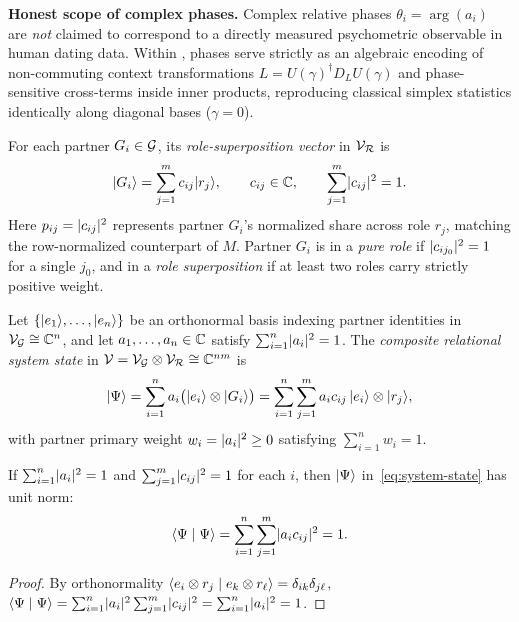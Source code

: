 \noindent\layerbehav{} \textbf{Honest scope of complex phases.} Complex relative phases
$\theta_i = \arg(a_i)$ are \emph{not} claimed to correspond to a directly measured
psychometric observable in human dating data. Within \RST{}, phases serve strictly as an
algebraic encoding of non-commuting context transformations $L = U(\gamma)^\dagger D_L U(\gamma)$
and phase-sensitive cross-terms inside inner products, reproducing classical simplex
statistics identically along diagonal bases ($\gamma = 0$).

\begin{definition}
\label{def:partner-state}
For each partner $G_i \in \mathcal{G}$, its \emph{role-superposition vector} in $\mathcal{V}_{\mathcal{R}}$ is
\begin{equation}
  \lvert G_i \rangle = \sum_{j=1}^{m} c_{ij} \lvert r_j \rangle,
  \qquad c_{ij} \in \mathbb{C},
  \qquad \sum_{j=1}^{m} \lvert c_{ij} \rvert^2 = 1.
  \label{eq:partner-state}
\end{equation}
Here $p_{ij} = \lvert c_{ij} \rvert^2$ represents partner $G_i$'s normalized share across role $r_j$,
matching the row-normalized counterpart of $M$. Partner $G_i$ is in a \emph{pure role} if
$\lvert c_{ij_0} \rvert^2 = 1$ for a single $j_0$, and in a \emph{role superposition} if at least
two roles carry strictly positive weight.
\end{definition}

\begin{definition}
\label{def:system-state}
Let $\{\lvert e_1 \rangle, \dots, \lvert e_n \rangle\}$ be an orthonormal basis indexing partner identities
in $\mathcal{V}_{\mathcal{G}} \cong \mathbb{C}^n$, and let $a_1, \dots, a_n \in \mathbb{C}$ satisfy
$\sum_{i=1}^n \lvert a_i \rvert^2 = 1$. The \emph{composite relational system state} in
$\mathcal{V} = \mathcal{V}_{\mathcal{G}} \otimes \mathcal{V}_{\mathcal{R}} \cong \mathbb{C}^{nm}$ is
\begin{equation}
  \lvert \Psi \rangle = \sum_{i=1}^{n} a_i \bigl(\lvert e_i \rangle \otimes \lvert G_i \rangle\bigr)
  = \sum_{i=1}^{n} \sum_{j=1}^{m} a_i c_{ij}\, \lvert e_i \rangle \otimes \lvert r_j \rangle,
  \label{eq:system-state}
\end{equation}
with partner primary weight $w_i = \lvert a_i \rvert^2 \ge 0$ satisfying $\sum_{i=1}^n w_i = 1$.
\end{definition}

\begin{lemma}
\label{lem:composite-norm}
If $\sum_{i=1}^n \lvert a_i \rvert^2 = 1$ and $\sum_{j=1}^m \lvert c_{ij} \rvert^2 = 1$ for each $i$, then
$\lvert \Psi \rangle$ in~\eqref{eq:system-state} has unit norm:
\begin{equation}
  \langle \Psi \mid \Psi \rangle = \sum_{i=1}^{n} \sum_{j=1}^{m} \lvert a_i c_{ij} \rvert^2 = 1.
  \label{eq:composite-norm}
\end{equation}
\end{lemma}
\begin{proof}
By orthonormality $\langle e_i \otimes r_j \mid e_k \otimes r_\ell \rangle = \delta_{ik}\delta_{j\ell}$,
$\langle \Psi \mid \Psi \rangle = \sum_{i=1}^n \lvert a_i \rvert^2 \sum_{j=1}^m \lvert c_{ij} \rvert^2 = \sum_{i=1}^n \lvert a_i \rvert^2 = 1$.
\end{proof}

